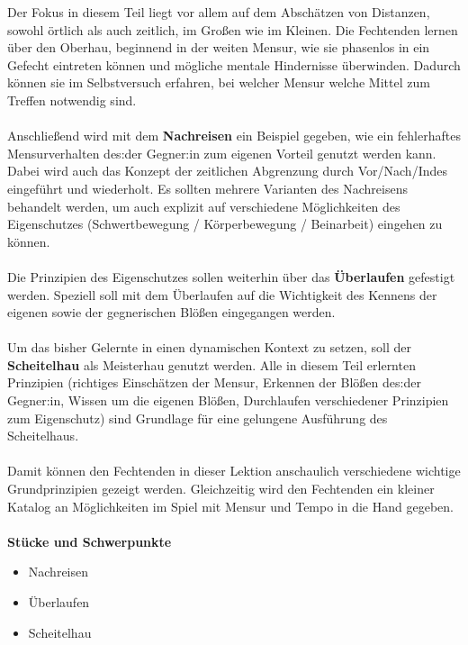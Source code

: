 Der Fokus in diesem Teil liegt vor allem auf dem Abschätzen von Distanzen, sowohl örtlich als auch zeitlich, im Großen wie im Kleinen.
Die Fechtenden lernen über den Oberhau, beginnend in der weiten Mensur, wie sie phasenlos in ein Gefecht eintreten können und mögliche mentale Hindernisse überwinden.
Dadurch können sie im Selbstversuch erfahren, bei welcher Mensur welche Mittel zum Treffen notwendig sind.
\\
\\
Anschließend wird mit dem \textbf{Nachreisen} ein Beispiel gegeben, wie ein fehlerhaftes Mensurverhalten des:der Gegner:in zum eigenen Vorteil genutzt werden kann.
Dabei wird auch das Konzept der zeitlichen Abgrenzung durch Vor/Nach/Indes eingeführt und wiederholt.
Es sollten mehrere Varianten des Nachreisens behandelt werden, um auch explizit auf verschiedene Möglichkeiten des Eigenschutzes (Schwertbewegung / Körperbewegung / Beinarbeit) eingehen zu können.
\\
\\
Die Prinzipien des Eigenschutzes sollen weiterhin über das \textbf{Überlaufen} gefestigt werden.
Speziell soll mit dem Überlaufen auf die Wichtigkeit des Kennens der eigenen sowie der gegnerischen Blößen eingegangen werden.
\\
\\
Um das bisher Gelernte in einen dynamischen Kontext zu setzen, soll der \textbf{Scheitelhau} als Meisterhau genutzt werden.
Alle in diesem Teil erlernten Prinzipien (richtiges Einschätzen der Mensur, Erkennen der Blößen des:der Gegner:in, Wissen um die eigenen Blößen, Durchlaufen verschiedener Prinzipien zum Eigenschutz) sind Grundlage für eine gelungene Ausführung des Scheitelhaus.
\\
\\
Damit können den Fechtenden in dieser Lektion anschaulich verschiedene wichtige Grundprinzipien gezeigt werden.
Gleichzeitig wird den Fechtenden ein kleiner Katalog an Möglichkeiten im Spiel mit Mensur und Tempo in die Hand gegeben.
\\
\\
\textbf{Stücke und Schwerpunkte}

\begin{itemize}
    \item Nachreisen
    \item Überlaufen
    \item Scheitelhau
\end{itemize}

\hspace{0.5cm}

